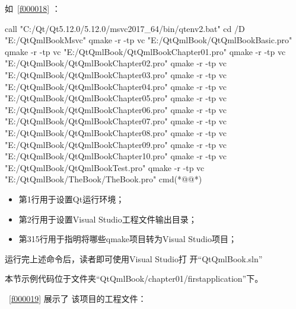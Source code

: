 如\filesourcenumbernameone\ \ref{f000018} ：


\label{f000018}    %
\FloatBarrier                                  %
\begin{thebookfilesourceone}[escapeinside={(*@}{@*)},
caption=GoodLuck,
title=\filesourcenumbernameone \thefilesourcenumber
]
call "C:/Qt/Qt5.12.0/5.12.0/msvc2017_64/bin/qtenv2.bat"
cd /D "E:/QtQmlBookMsvc"
qmake -r -tp vc "E:/QtQmlBook/QtQmlBookBasic.pro"
qmake -r -tp vc "E:/QtQmlBook/QtQmlBookChapter01.pro"
qmake -r -tp vc "E:/QtQmlBook/QtQmlBookChapter02.pro"
qmake -r -tp vc "E:/QtQmlBook/QtQmlBookChapter03.pro"
qmake -r -tp vc "E:/QtQmlBook/QtQmlBookChapter04.pro"
qmake -r -tp vc "E:/QtQmlBook/QtQmlBookChapter05.pro"
qmake -r -tp vc "E:/QtQmlBook/QtQmlBookChapter06.pro"
qmake -r -tp vc "E:/QtQmlBook/QtQmlBookChapter07.pro"
qmake -r -tp vc "E:/QtQmlBook/QtQmlBookChapter08.pro"
qmake -r -tp vc "E:/QtQmlBook/QtQmlBookChapter09.pro"
qmake -r -tp vc "E:/QtQmlBook/QtQmlBookChapter10.pro"
qmake -r -tp vc "E:/QtQmlBook/QtQmlBookTest.pro"
qmake -r -tp vc "E:/QtQmlBook/TheBook/TheBook.pro"
cmd(*@\marginpar[\hfill\setlength\fboxsep{2pt}\fbox{\footnotesize{\kaishu\parbox{1em}{\setlength{\baselineskip}{2pt}\filesourcenumbernameone}}\footnotesize{\thefilesourcenumber}}]{\setlength\fboxsep{2pt}\fbox{\footnotesize{\kaishu\parbox{1em}{\setlength{\baselineskip}{2pt}\filesourcenumbernameone}}\footnotesize{\thefilesourcenumber}}}@*)\end{thebookfilesourceone}          %
\addtocounter{lstlisting}{-1}   %



\begin{itemize}

\item 第1行用于设置Qt运行环境；
\item 第2行用于设置Visual Studio工程文件输出目录；
\item 第3\raisebox{0.16ex}{\sourcefonttwo\~{}}15行用于指明将哪些qmake项目转为Visual Studio项目；

\end{itemize}

运行完上述命令后，读者即可使用Visual Studio打
开“QtQmlBook.sln”

本节示例代码位于文件夹“QtQmlBook/chapter01/firstapplication”下。

\filesourcenumbernameone\ \ref{f000019}
展示了
该项目的工程文件：

